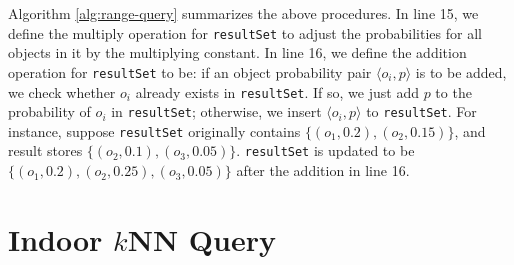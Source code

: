 \documentclass[12pt]{report}
\begin{document}
Algorithm \ref{alg:range-query} summarizes the above procedures.  In
line 15, we define the multiply operation for \texttt{resultSet} to
adjust the probabilities for all objects in it by the multiplying
constant.  In line 16, we define the addition operation for
\texttt{resultSet} to be: if an object probability pair \(\langle o_i,
    p\rangle\) is to be added, we check whether \(o_i\) already exists
in \texttt{resultSet}.  If so, we just add \(p\) to the probability of
\(o_i\) in \texttt{resultSet}; otherwise, we insert \(\langle o_i,
    p\rangle\) to \texttt{resultSet}.  For instance, suppose \texttt{resultSet}
originally contains \(\{(o_1, 0.2), (o_2, 0.15)\}\), and result
stores \(\{(o_2, 0.1), (o_3, 0.05)\}\).  \texttt{resultSet} is updated to
be \(\{(o_1, 0.2), (o_2, 0.25), (o_3, 0.05)\}\) after the addition
in line 16.

\section{Indoor \(k\)NN Query}
\label{sec:org603decf}
\end{document}

